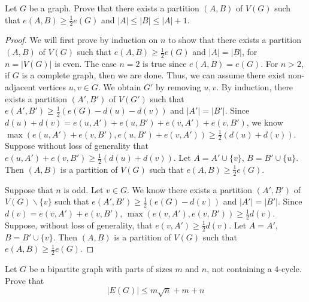 \documentclass{article}
\newenvironment{problem}[2][Question]{\begin{trivlist}
\item[\hskip \labelsep {\bfseries #1}\hskip \labelsep {\bfseries #2.}]}{\end{trivlist}}
\begin{document}
\newpage

\begin{problem}{5.9.8}
    Let $G$ be a graph. Prove that there exists a partition $(A, B)$ of $V(G)$ such that $e(A,B) \geq \frac{1}{2}e(G)$ and $|A| \leq |B| \leq |A| + 1$.
\end{problem}

\begin{proof}
    We will first prove by induction on $n$ to show that there exists a partition $(A, B)$ of $V(G)$ such that $e(A,B) \geq \frac{1}{2}e(G)$ and $|A| = |B|$, for $n = |V(G)|$ is even. The case $n = 2$ is true since $e(A, B) = e(G)$. For $n > 2$, if $G$ is a complete graph, then we are done. Thus, we can assume there exist non-adjacent vertices $u,v \in G$. We obtain $G'$ by removing $u, v$. By induction, there exists a partition $(A', B')$ of $V(G')$ such that $e(A', B') \geq \frac{1}{2}(e(G) - d(u) - d(v))$ and $|A'| = |B'|$. Since $d(u) + d(v) = e(u, A') + e(u, B') + e(v, A') + e(v, B')$, we know $\max(e(u, A') + e(v, B'), e(u, B') + e(v, A')) \geq \frac{1}{2}(d(u) + d(v))$. Suppose without loss of generality that $e(u, A') + e(v, B') \geq \frac{1}{2}(d(u) + d(v))$. Let $A = A' \cup \{v\}$, $B = B' \cup \{u\}$. Then $(A, B)$ is a partition of $V(G)$ such that $e(A, B) \geq \frac{1}{2}e(G)$. 
    
    Suppose that $n$ is odd. Let $v \in G$. We know there exists a partition $(A',B')$ of $V(G)\backslash \{v\}$ such that $e(A',B') \geq \frac{1}{2}(e(G) - d(v))$ and $|A'| = |B'|$. Since $d(v) = e(v, A') + e(v, B')$, $\max(e(v, A'), e(v, B')) \geq \frac{1}{2}d(v)$. Suppose, without loss of generality, that $e(v, A') \geq \frac{1}{2}d(v)$. Let $A = A'$, $B = B' \cup \{v\}$. Then $(A,B)$ is a partition of $V(G)$ such that $e(A,B) \geq \frac{1}{2}e(G)$.
\end{proof} 

\newpage

\begin{problem}{5.9.12}
    Let $G$ be a bipartite graph with parts of sizes $m$ and $n$, not containing a $4$-cycle. Prove that
    \[
        |E(G)| \leq m\sqrt{n} + m + n
    \]
\end{problem}
\end{document}

